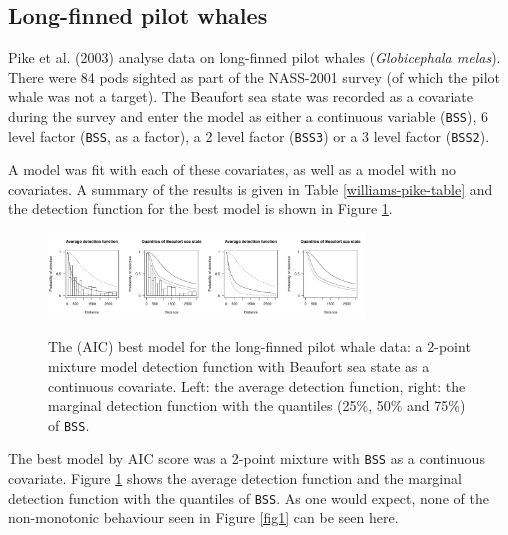 \documentclass[useAMS,referee]{biom}
\begin{document}
\subsection{Long-finned pilot whales}

Pike et al. (2003) analyse data on long-finned pilot whales (\textit{Globicephala melas}). There were 84 pods sighted as part of the NASS-2001 survey (of which the pilot whale was not a target). The Beaufort sea state was recorded as a covariate during the survey and enter the model as either a continuous variable (\texttt{BSS}), 6 level factor (\texttt{BSS}, as a factor), a 2 level factor (\texttt{BSS3}) or a 3 level factor (\texttt{BSS2}).

A model was fit with each of these covariates, as well as a model with no covariates. A summary of the results is given in Table \ref{williams-pike-table} and the detection function for the best model is shown in Figure \ref{danpike-detfct}.

\begin{figure}
\centering
\includegraphics[width=0.375\textwidth, trim= 0 0 3.8in 0, clip=true]{analyses/danpike-bssc.pdf}\includegraphics[width=0.375\textwidth, trim= 3.8in 0 0 0, clip=true]{analyses/danpike-bssc-hh.pdf}
\caption{The (AIC) best model for the long-finned pilot whale data: a 2-point mixture model detection function with Beaufort sea state as a continuous covariate. Left: the average detection function, right: the marginal detection function with the quantiles (25\%, 50\% and 75\%) of \texttt{BSS}.}
\label{danpike-detfct}
\end{figure}

The best model by AIC score was a 2-point mixture with \texttt{BSS} as a continuous covariate. Figure \ref{danpike-detfct} shows the average detection function and the marginal detection function with the quantiles of \texttt{BSS}. As one would expect, none of the non-monotonic behaviour seen in Figure \ref{fig1} can be seen here.
\end{document}
